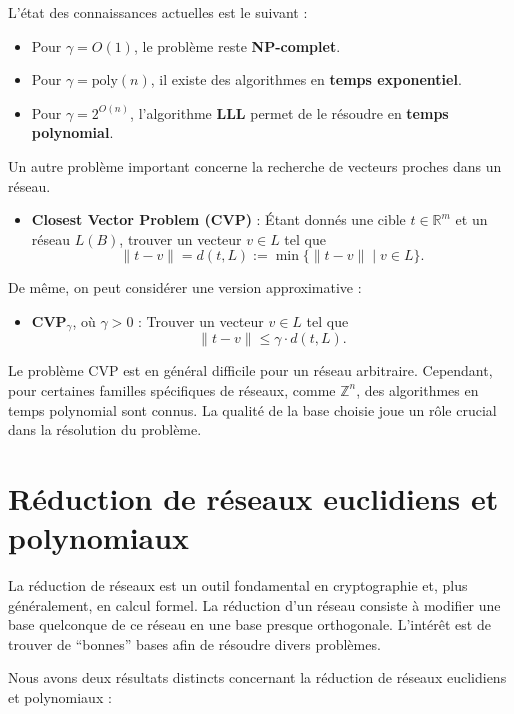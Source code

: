 \documentclass[a4paper,12pt]{report}  %
\theoremstyle{definitionstyle}
\theoremstyle{examplestyle}
\theoremstyle{remarkstyle}
\theoremstyle{propositionstyle}
\theoremstyle{theoremstyle}
\begin{document}
	L’état des connaissances actuelles est le suivant :
	
	\begin{itemize}
		\item Pour $\gamma = O(1)$, le problème reste \textbf{NP-complet}.
		\item Pour $\gamma = \text{poly}(n)$, il existe des algorithmes en \textbf{temps exponentiel}.
		\item Pour $\gamma = 2^{O(n)}$, l’algorithme \textbf{LLL} permet de le résoudre en \textbf{temps polynomial}.
	\end{itemize}
	
	Un autre problème important concerne la recherche de vecteurs proches dans un réseau.
	
	\begin{itemize}
		\item \textbf{Closest Vector Problem (CVP)} : Étant donnés une cible $t \in \mathbb{R}^m$ et un réseau $L(B)$, trouver un vecteur $v \in L$ tel que 
		\[
		\|t - v\| = d(t, L) := \min \{ \|t - v\| \mid v \in L \}.
		\]
	\end{itemize}
	
	De même, on peut considérer une version approximative :
	
	\begin{itemize}
		\item \textbf{CVP$_\gamma$}, où $\gamma > 0$ : Trouver un vecteur $v \in L$ tel que 
		\[
		\|t - v\| \leq \gamma \cdot d(t, L).
		\]
	\end{itemize}
	
	Le problème CVP est en général difficile pour un réseau arbitraire. Cependant, pour certaines familles spécifiques de réseaux, comme $\mathbb{Z}^n$, des algorithmes en temps polynomial sont connus. La qualité de la base choisie joue un rôle crucial dans la résolution du problème.
		
	\section{Réduction de réseaux euclidiens et polynomiaux}
	
	
	La réduction de réseaux est un outil fondamental en cryptographie et, plus généralement, en calcul formel. La réduction d'un réseau consiste à modifier une base quelconque de ce réseau en une base presque orthogonale. L'intérêt est de trouver de ``bonnes'' bases afin de résoudre divers problèmes.
	
	Nous avons deux résultats distincts concernant la réduction de réseaux euclidiens et polynomiaux :
	
\end{document}
